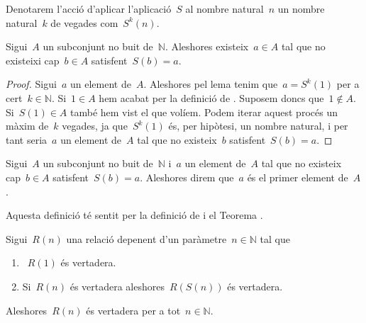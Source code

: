 \documentclass[../../main.tex]{subfiles}
\begin{document}
    \begin{notation}
        Denotarem l'acció d'aplicar l'aplicació~\(S\) al nombre natural~\(n\) un nombre natural~\(k\) de vegades com~\(S^{k}(n)\).
    \end{notation}
    \begin{theorem}
        \label{thm:primer-element}
        Sigui~\(A\) un subconjunt no buit de~\(\mathbb{N}\).
        Aleshores existeix~\(a\in A\) tal que no existeixi cap~\(b\in A\) satisfent~\(S(b)=a\).
    \end{theorem}
    \begin{proof}
        Sigui~\(a\) un element de~\(A\).
        Aleshores pel lema  tenim que~\(a=S^{k}(1)\) per a cert~\(k\in\mathbb{N}\).
        Si~\(1\in A\) hem acabat per la definició de .
        Suposem doncs que~\(1\notin A\).
        Si~\(S(1)\in A\) també hem vist el que volíem.
        Podem iterar aquest procés un màxim de~\(k\) vegades, ja que~\(S^{k}(1)\) és, per hipòtesi, un nombre natural, i per tant seria~\(a\) un element de~\(A\) tal que no existeix~\(b\) satisfent~\(S(b)=a\).
    \end{proof}
    \begin{definition}
        \label{def:primer-element}
        Sigui~\(A\) un subconjunt no buit de~\(\mathbb{N}\) i~\(a\) un element de~\(A\) tal que no existeix cap~\(b\in A\) satisfent~\(S(b)=a\).
        Aleshores direm que~\(a\) és el primer element de~\(A\).

        Aquesta definició té sentit per la definició de  i el Teorema .
    \end{definition}
    \begin{theorem}
        \label{thm:principi-dinduccio}
        Sigui~\(R(n)\) una relació depenent d'un paràmetre~\(n\in\mathbb{N}\) tal que
        \begin{enumerate}
            \item\label{enum:thm:principi-dinduccio-1}~\(R(1)\) és vertadera.
            \item\label{enum:thm:principi-dinduccio-2} Si~\(R(n)\) és vertadera aleshores~\(R(S(n))\) és vertadera.
        \end{enumerate}
        Aleshores~\(R(n)\) és vertadera per a tot~\(n\in\mathbb{N}\).
    \end{theorem}
\end{document}
